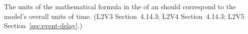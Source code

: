 The units of the mathematical formula in the  of an \Event
should correspond to the model's overall units of time.  (L2V3
Section~4.14.3; L2V4 Section~4.14.3; L2V5 Section~\ref{sec:event-delay}.)

